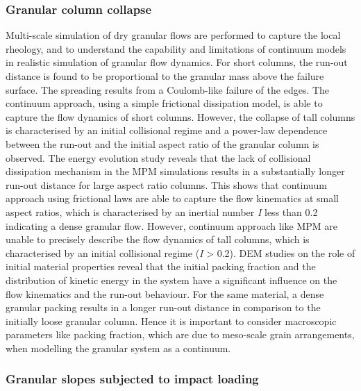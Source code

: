 \subsubsection*{Granular column collapse}

Multi-scale simulation of dry granular flows are performed to capture the 
local rheology, and to understand the capability and limitations of continuum 
models in realistic simulation of granular flow dynamics. For short columns, 
the run-out distance is found to be proportional to the granular mass above the 
failure surface. The spreading results from a Coulomb-like failure of the 
edges. The continuum approach, using a simple frictional dissipation model, is 
able to capture the flow dynamics of short columns. However, the collapse of 
tall columns is characterised by an initial collisional regime and a power-law 
dependence between the run-out and the initial aspect ratio of the granular 
column is observed. The energy evolution study reveals that the lack of 
collisional dissipation mechanism in the MPM simulations results in a 
substantially longer run-out distance for large aspect ratio columns. This 
shows that continuum approach using frictional laws are able to capture the 
flow kinematics at small aspect ratios, which is characterised by an inertial 
number \textit{I} less than 0.2 indicating a dense granular flow. However, 
continuum approach like MPM are unable to precisely describe the flow dynamics 
of tall columns, which is characterised by an initial collisional regime 
(\textit{I} > 0.2). DEM studies on the role of initial material properties 
reveal that the initial packing fraction and the distribution of kinetic energy 
in the system have a significant influence on the flow kinematics and the 
run-out behaviour. For the same material, a dense granular packing results in a 
longer run-out distance in comparison to the initially loose granular column. 
Hence it is important to consider macroscopic parameters like packing fraction, 
which are due to meso-scale grain arrangements, when modelling the granular 
system as a continuum.

\subsubsection*{Granular slopes subjected to impact loading}

